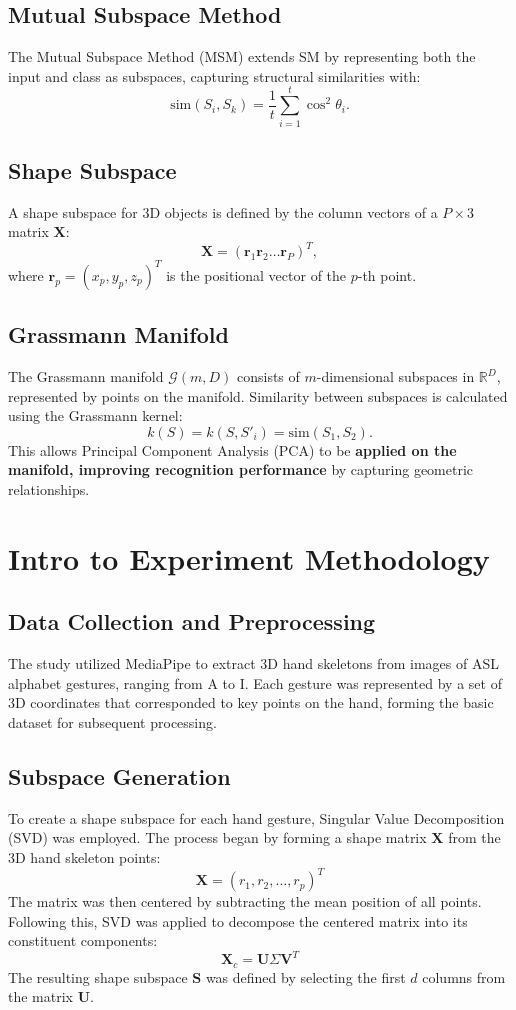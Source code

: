 \documentclass[12pt,a4paper]{article}
\begin{document}
\subsection{Mutual Subspace Method}
The Mutual Subspace Method (MSM) extends SM by representing both the input and class as subspaces, capturing structural similarities with:
\[
\text{sim}(S_i, S_k) = \frac{1}{t} \sum_{i=1}^{t} \cos^2 \theta_i.
\]

\subsection{Shape Subspace}
A shape subspace for 3D objects is defined by the column vectors of a $P \times 3$ matrix $\mathbf{X}$:
\[
\mathbf{X} = (\mathbf{r}_1 \mathbf{r}_2 \ldots \mathbf{r}_P)^T,
\]
where $\mathbf{r}_p = (x_p, y_p, z_p)^T$ is the positional vector of the $p$-th point.

\subsection{Grassmann Manifold}
The Grassmann manifold $\mathcal{G}(m, D)$ consists of $m$-dimensional subspaces in $\mathbb{R}^D$, represented by points on the manifold. Similarity between subspaces is calculated using the Grassmann kernel:
\[
k(S) = k(S, S'_i) = \text{sim}(S_1, S_2).
\]
This allows Principal Component Analysis (PCA) to be \textbf{applied on the manifold, improving recognition performance} by capturing geometric relationships.

\section{Intro to Experiment Methodology}

\subsection{Data Collection and Preprocessing}
The study utilized MediaPipe to extract 3D hand skeletons from images of ASL alphabet gestures, ranging from A to I. Each gesture was represented by a set of 3D coordinates that corresponded to key points on the hand, forming the basic dataset for subsequent processing.

\subsection{Subspace Generation}
To create a shape subspace for each hand gesture, Singular Value Decomposition (SVD) was employed. The process began by forming a shape matrix $\mathbf{X}$ from the 3D hand skeleton points:
\[
\mathbf{X} = (r_1, r_2, \ldots, r_p)^T
\]
The matrix was then centered by subtracting the mean position of all points. Following this, SVD was applied to decompose the centered matrix into its constituent components:
\[
\mathbf{X}_c = \mathbf{U} \Sigma \mathbf{V}^T
\]
The resulting shape subspace $\mathbf{S}$ was defined by selecting the first $d$ columns from the matrix $\mathbf{U}$.
\end{document}
